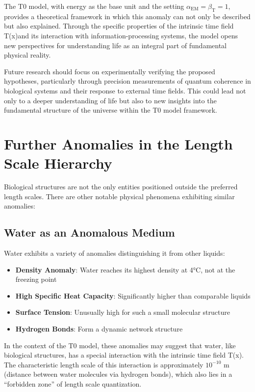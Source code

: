 \documentclass[12pt,a4paper]{article}
\newcommand{\Tfield}{T(x)}
\newcommand{\alphaEM}{\alpha_{\text{EM}}}
\newcommand{\betaT}{\beta_{\text{T}}}
\begin{document}
	The T0 model, with energy as the base unit and the setting $\alphaEM = \betaT = 1$, provides a theoretical framework in which this anomaly can not only be described but also explained. Through the specific properties of the intrinsic time field \Tfield and its interaction with information-processing systems, the model opens new perspectives for understanding life as an integral part of fundamental physical reality.
	
	Future research should focus on experimentally verifying the proposed hypotheses, particularly through precision measurements of quantum coherence in biological systems and their response to external time fields. This could lead not only to a deeper understanding of life but also to new insights into the fundamental structure of the universe within the T0 model framework.
	
	\section{Further Anomalies in the Length Scale Hierarchy}
	
	Biological structures are not the only entities positioned outside the preferred length scales. There are other notable physical phenomena exhibiting similar anomalies:
	
	\subsection{Water as an Anomalous Medium}
	
	Water exhibits a variety of anomalies distinguishing it from other liquids:
	
	\begin{itemize}
		\item \textbf{Density Anomaly}: Water reaches its highest density at 4°C, not at the freezing point
		\item \textbf{High Specific Heat Capacity}: Significantly higher than comparable liquids
		\item \textbf{Surface Tension}: Unusually high for such a small molecular structure
		\item \textbf{Hydrogen Bonds}: Form a dynamic network structure
	\end{itemize}
	
	In the context of the T0 model, these anomalies may suggest that water, like biological structures, has a special interaction with the intrinsic time field \Tfield. The characteristic length scale of this interaction is approximately $10^{-10}$ m (distance between water molecules via hydrogen bonds), which also lies in a ``forbidden zone'' of length scale quantization.
	
\end{document}

